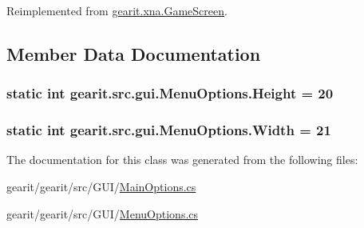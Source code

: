 Reimplemented from \hyperlink{classgearit_1_1xna_1_1_game_screen_a6bb803502dfbd62b275c2a21d182f88e}{gearit.\+xna.\+Game\+Screen}.



\subsection{Member Data Documentation}
\hypertarget{classgearit_1_1src_1_1gui_1_1_menu_options_a90484bfb71600428bf5e0f905f4e5aab}{
\subsubsection[{Height}]{\setlength{\rightskip}{0pt plus 5cm}static int gearit.\+src.\+gui.\+Menu\+Options.\+Height = 20\hspace{0.3cm}{\ttfamily [static]}}}\label{classgearit_1_1src_1_1gui_1_1_menu_options_a90484bfb71600428bf5e0f905f4e5aab}
\hypertarget{classgearit_1_1src_1_1gui_1_1_menu_options_aea869e53cb23d1a21bcf3b3d6a10b695}{
\subsubsection[{Width}]{\setlength{\rightskip}{0pt plus 5cm}static int gearit.\+src.\+gui.\+Menu\+Options.\+Width = 21\hspace{0.3cm}{\ttfamily [static]}}}\label{classgearit_1_1src_1_1gui_1_1_menu_options_aea869e53cb23d1a21bcf3b3d6a10b695}


The documentation for this class was generated from the following files\+:\begin{DoxyCompactItemize}
\item 
gearit/gearit/src/\+G\+U\+I/\hyperlink{_g_u_i_2_main_options_8cs}{Main\+Options.\+cs}\item 
gearit/gearit/src/\+G\+U\+I/\hyperlink{_menu_options_8cs}{Menu\+Options.\+cs}\end{DoxyCompactItemize}
